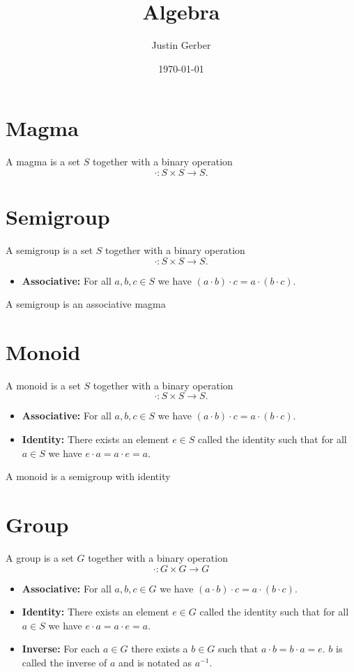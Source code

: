 \documentclass[12pt]{article}
\begin{document}
\title{Algebra}
\author{Justin Gerber}
\date{\today}
\maketitle

\section{Magma}

A magma is a set $S$ together with a binary operation
$$
\cdot: S\times S \rightarrow S.
$$

\section{Semigroup}

A semigroup is a set $S$ together with a binary operation
$$
\cdot: S\times S \rightarrow S.
$$
\begin{itemize}
\item{\textbf{Associative:} For all $a, b, c \in S$ we have $(a\cdot b)\cdot c = a \cdot(b\cdot c).$}
\end{itemize}
A semigroup is an associative magma

\section{Monoid}

A monoid is a set $S$ together with a binary operation
$$
\cdot: S \times S \rightarrow S.
$$
\begin{itemize}
\item{\textbf{Associative:} For all $a, b, c \in S$ we have $(a\cdot b)\cdot c = a \cdot(b\cdot c).$}
\item{\textbf{Identity:} There exists an element $e\in S$ called the identity such that for all $a\in S$ we have $e\cdot a = a \cdot e = a$.}
\end{itemize}

A monoid is a semigroup with identity

\section{Group}

A group is a set $G$ together with a binary operation
$$
\cdot: G \times G \rightarrow G
$$

\begin{itemize}
\item{\textbf{Associative:} For all $a, b, c \in G$ we have $(a\cdot b)\cdot c = a \cdot(b\cdot c).$}
\item{\textbf{Identity:} There exists an element $e\in G$ called the identity such that for all $a\in S$ we have $e\cdot a = a \cdot e = a$.}
\item{\textbf{Inverse:} For each $a\in G$ there exists a $b \in G$ such that $a \cdot b = b \cdot a = e$. $b$ is called the inverse of $a$ and is notated as $a^{-1}$.}
\end{itemize}
\end{document}
